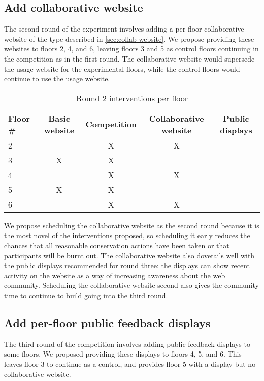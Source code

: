 \documentclass[11pt]{article}
\begin{document}
\subsection{Add collaborative website}

The second round of the experiment involves adding a per-floor collaborative website of the type described in \autoref{sec:collab-website}. We propose providing these websites to floors 2, 4, and 6, leaving floors 3 and 5 as control floors continuing in the competition as in the first round. The collaborative website would supersede the usage website for the experimental floors, while the control floors would continue to use the usage website.

\begin{table}[htbp]
	\centering
		\begin{tabular}{| l || c | c | c | c |}
			\hline
			Floor \# & Basic website & Competition & Collaborative website & Public displays \tabularnewline \hline \hline
			
			2 &   & X & X & \tabularnewline \hline
			
			3 & X & X &  & \tabularnewline \hline

			4 &   & X & X & \tabularnewline \hline

			5 & X & X &  & \tabularnewline \hline
			
			6 &   & X & X & \tabularnewline \hline
		\end{tabular}
	\caption{Round 2 interventions per floor}
	\label{tab:round2-per-floor}
\end{table}

We propose scheduling the collaborative website as the second round because it is the most novel of the interventions proposed, so scheduling it early reduces the chances that all reasonable conservation actions have been taken or that participants will be burnt out. The collaborative website also dovetails well with the public displays recommended for round three: the displays can show recent activity on the website as a way of increasing awareness about the web community. Scheduling the collaborative website second also gives the community time to continue to build going into the third round.

\subsection{Add per-floor public feedback displays}

The third round of the competition involves adding public feedback displays to some floors. We proposed providing these displays to floors 4, 5, and 6. This leaves floor 3 to continue as a control, and provides floor 5 with a display but no collaborative website.
\end{document}
